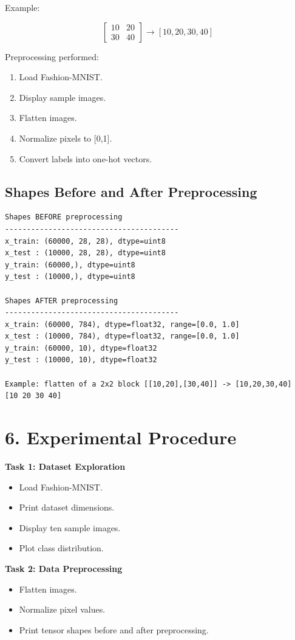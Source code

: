 \documentclass[11pt]{article}
\begin{document}
Example:

\[
\begin{bmatrix}
10&20\\30&40
\end{bmatrix}
\rightarrow
[10,20,30,40]
\]

Preprocessing performed:
\begin{enumerate}
\item Load Fashion-MNIST.
\item Display sample images.
\item Flatten images.
\item Normalize pixels to [0,1].
\item Convert labels into one-hot vectors.
\end{enumerate}

\subsection*{Shapes Before and After Preprocessing}
\begin{lstlisting}[style=output]
Shapes BEFORE preprocessing
----------------------------------------
x_train: (60000, 28, 28), dtype=uint8
x_test : (10000, 28, 28), dtype=uint8
y_train: (60000,), dtype=uint8
y_test : (10000,), dtype=uint8

Shapes AFTER preprocessing
----------------------------------------
x_train: (60000, 784), dtype=float32, range=[0.0, 1.0]
x_test : (10000, 784), dtype=float32, range=[0.0, 1.0]
y_train: (60000, 10), dtype=float32
y_test : (10000, 10), dtype=float32

Example: flatten of a 2x2 block [[10,20],[30,40]] -> [10,20,30,40]
[10 20 30 40]
\end{lstlisting}

\section*{6. Experimental Procedure}

\textbf{Task 1: Dataset Exploration}
\begin{itemize}
\item Load Fashion-MNIST.
\item Print dataset dimensions.
\item Display ten sample images.
\item Plot class distribution.
\end{itemize}


\bigskip
\textbf{Task 2: Data Preprocessing}
\begin{itemize}
\item Flatten images.
\item Normalize pixel values.
\item Print tensor shapes before and after preprocessing.
\end{itemize}
\end{document}
